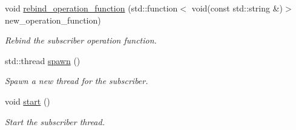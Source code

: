 \begin{DoxyCompactItemize}
void \hyperlink{classzcm_1_1Subscriber_aab48fd83ea797680fba25be1f3c7ba14}{rebind\+\_\+operation\+\_\+function} (std\+::function$<$ void(const std\+::string \&)$>$ new\+\_\+operation\+\_\+function)
\begin{DoxyCompactList}\small\item\em Rebind the subscriber operation function. \end{DoxyCompactList}\item 
std\+::thread \hyperlink{classzcm_1_1Subscriber_a05334a6b27ce47e46ad525c2fc015347}{spawn} ()
\begin{DoxyCompactList}\small\item\em Spawn a new thread for the subscriber. \end{DoxyCompactList}\item 
void \hyperlink{classzcm_1_1Subscriber_af255252bdc1808c7436208b919612a48}{start} ()
\begin{DoxyCompactList}\small\item\em Start the subscriber thread. \end{DoxyCompactList}\end{DoxyCompactItemize}

